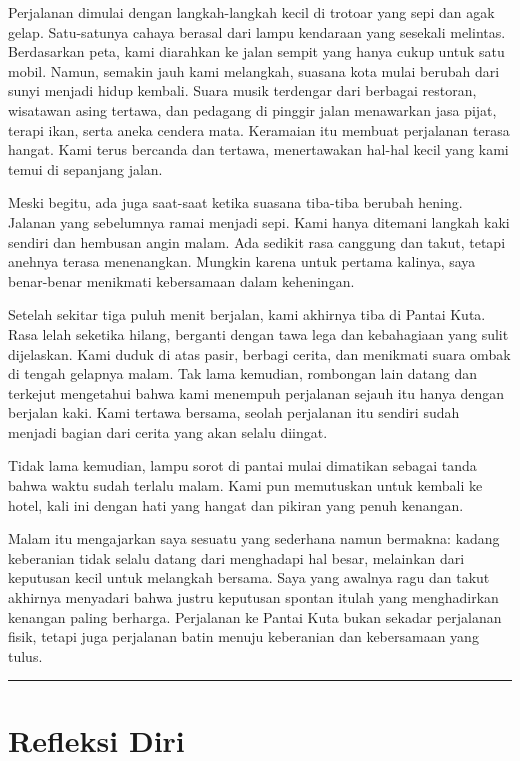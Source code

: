 \documentclass[
  letterpaper,
  DIV=11,
  numbers=noendperiod]{scrreprt}
\begin{document}
Perjalanan dimulai dengan langkah-langkah kecil di trotoar yang sepi dan
agak gelap. Satu-satunya cahaya berasal dari lampu kendaraan yang
sesekali melintas. Berdasarkan peta, kami diarahkan ke jalan sempit yang
hanya cukup untuk satu mobil. Namun, semakin jauh kami melangkah,
suasana kota mulai berubah dari sunyi menjadi hidup kembali. Suara musik
terdengar dari berbagai restoran, wisatawan asing tertawa, dan pedagang
di pinggir jalan menawarkan jasa pijat, terapi ikan, serta aneka cendera
mata. Keramaian itu membuat perjalanan terasa hangat. Kami terus
bercanda dan tertawa, menertawakan hal-hal kecil yang kami temui di
sepanjang jalan.

Meski begitu, ada juga saat-saat ketika suasana tiba-tiba berubah
hening. Jalanan yang sebelumnya ramai menjadi sepi. Kami hanya ditemani
langkah kaki sendiri dan hembusan angin malam. Ada sedikit rasa canggung
dan takut, tetapi anehnya terasa menenangkan. Mungkin karena untuk
pertama kalinya, saya benar-benar menikmati kebersamaan dalam
keheningan.

Setelah sekitar tiga puluh menit berjalan, kami akhirnya tiba di Pantai
Kuta. Rasa lelah seketika hilang, berganti dengan tawa lega dan
kebahagiaan yang sulit dijelaskan. Kami duduk di atas pasir, berbagi
cerita, dan menikmati suara ombak di tengah gelapnya malam. Tak lama
kemudian, rombongan lain datang dan terkejut mengetahui bahwa kami
menempuh perjalanan sejauh itu hanya dengan berjalan kaki. Kami tertawa
bersama, seolah perjalanan itu sendiri sudah menjadi bagian dari cerita
yang akan selalu diingat.

Tidak lama kemudian, lampu sorot di pantai mulai dimatikan sebagai tanda
bahwa waktu sudah terlalu malam. Kami pun memutuskan untuk kembali ke
hotel, kali ini dengan hati yang hangat dan pikiran yang penuh kenangan.

Malam itu mengajarkan saya sesuatu yang sederhana namun bermakna: kadang
keberanian tidak selalu datang dari menghadapi hal besar, melainkan dari
keputusan kecil untuk melangkah bersama. Saya yang awalnya ragu dan
takut akhirnya menyadari bahwa justru keputusan spontan itulah yang
menghadirkan kenangan paling berharga. Perjalanan ke Pantai Kuta bukan
sekadar perjalanan fisik, tetapi juga perjalanan batin menuju keberanian
dan kebersamaan yang tulus.

\begin{center}\rule{0.5\linewidth}{0.5pt}\end{center}

\section{Refleksi Diri}\label{refleksi-diri-1}
\end{document}
